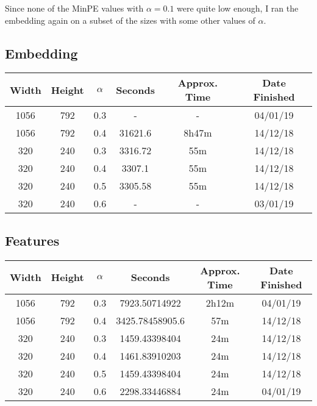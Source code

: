 Since none of the MinPE values with $\alpha = 0.1$ were quite low enough, I ran the embedding again on a subset of the sizes with some other values of $\alpha$.

\subsection{Embedding}
  \begin{center}
  \begin{tabular}{ c c | c | c c c }
  Width & Height & $\alpha$ & Seconds & Approx. Time & Date Finished \\ \hline
  1056 & 792 & 0.3 & - & - & 04/01/19 \\
  1056 & 792 & 0.4 & 31621.6 & 8h47m & 14/12/18 \\
  320 & 240 & 0.3 & 3316.72 & 55m & 14/12/18 \\
  320 & 240 & 0.4 & 3307.1 & 55m & 14/12/18 \\
  320 & 240 & 0.5 & 3305.58 & 55m & 14/12/18 \\
  320 & 240 & 0.6 & - & - & 03/01/19 \\
  \end{tabular}
  \end{center}

\subsection{Features}
  \begin{center}
  \begin{tabular}{ c c | c | c c c }
  Width & Height & $\alpha$ & Seconds & Approx. Time & Date Finished \\ \hline
  1056 & 792 & 0.3 & 7923.50714922 & 2h12m & 04/01/19 \\
  1056 & 792 & 0.4 & 3425.78458905.6 & 57m & 14/12/18 \\
  320 & 240 & 0.3 & 1459.43398404 & 24m & 14/12/18 \\
  320 & 240 & 0.4 & 1461.83910203 & 24m & 14/12/18 \\
  320 & 240 & 0.5 & 1459.43398404 & 24m & 14/12/18 \\
  320 & 240 & 0.6 & 2298.33446884 & 24m & 04/01/19 \\
  \end{tabular}
  \end{center}

